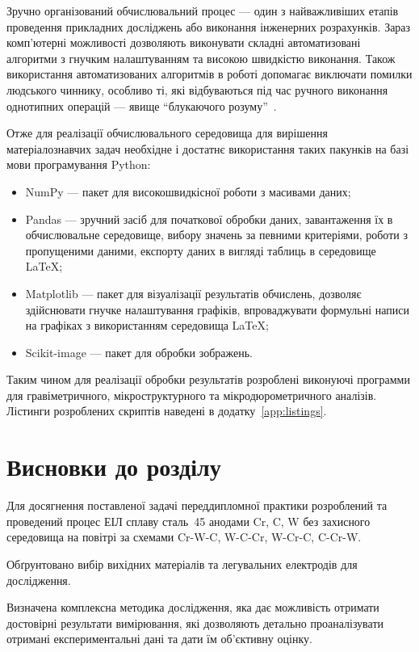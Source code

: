 \documentclass[a4paper,fontsize=14bp,ukrainian]{extreport}
\begin{document}
Зручно організований обчислювальний процес --- один з найважливіших етапів проведення прикладних досліджень або виконання інженерних розрахунків. Зараз комп'ютерні можливості дозволяють виконувати складні автоматизовані алгоритми з гнучким налаштуванням та високою швидкістю виконання. Також використання автоматизованих алгоритмів в роботі допомагає виключати помилки людського чиннику, особливо ті, які відбуваються під час ручного виконання однотипних операцій --- явище ``блукаючого розуму''~\cite{maillet2017}.

Отже для реалізації обчислювального середовища для вирішення матеріалознавчих задач необхідне і достатнє використання таких пакунків на базі мови програмування Python:
\begin{itemize}
\item NumPy --- пакет для високошвидкісної роботи з масивами даних;
\item Pandas --- зручний засіб для початкової обробки даних, завантаження їх в обчислювальне середовище, вибору значень за певними критеріями, роботи з пропущеними даними, експорту даних в вигляді таблиць в середовище \LaTeX;
\item Matplotlib --- пакет для візуалізації результатів обчислень, дозволяє здійснювати гнучке налаштування графіків, впроваджувати формульні написи на графіках з використанням середовища \LaTeX;
\item Scikit-image --- пакет для обробки зображень. \label{text:scikit-image}
\end{itemize}

Таким чином для реалізації обробки результатів розроблені виконуючі программи для гравіметричного, мікроструктурного та мікродюрометричного аналізів. Лістинги розроблених скриптів наведені в додатку~\ref{app:listings}.

\section{Висновки до розділу~\thechapter}

Для досягнення поставленої задачі переддипломної практики розроблений та проведений процес ЕІЛ сплаву сталь~45 анодами Cr, C, W без захисного середовища на повітрі за схемами Cr-W-C, W-C-Cr, W-Cr-C, C-Cr-W.

Обґрунтовано вибір вихідних матеріалів та легувальних електродів для дослідження.

Визначена комплексна методика дослідження, яка дає можливість отримати достовірні результати вимірювання, які дозволяють детально проаналізувати отримані експериментальні дані та дати їм об’єктивну оцінку.
\end{document}
